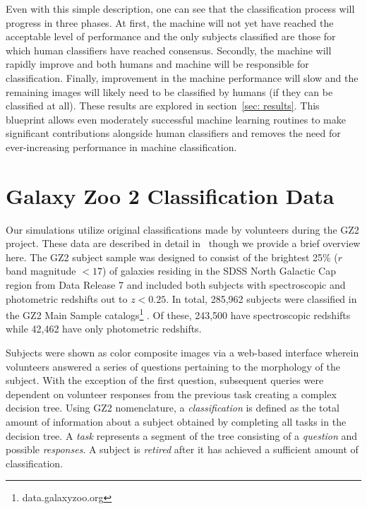 \documentclass[twocolumn]{aastex6}
\begin{document}
Even with this simple description, one can see that the classification process 
will progress in three phases. At first, the machine will not yet have reached the 
acceptable level of performance and the only subjects classified
 are those for which human classifiers have reached consensus. 
Secondly, the machine will rapidly improve and both humans and machine will be 
responsible for classification. Finally, improvement in the machine performance 
will slow and the remaining images will likely need to be classified by humans (if they can be 
classified at all). These results are explored in section~\ref{sec: results}. 
This blueprint allows even moderately successful machine learning 
routines to make significant contributions alongside human classifiers and 
removes the need for ever-increasing performance in machine classification.



\section{Galaxy Zoo 2 Classification Data} \label{sec: data}

Our simulations utilize original classifications made by volunteers during the GZ2 project. 
These data are described in detail in~\cite{Willett2013} though we provide a brief overview here.  
The GZ2 subject sample was designed to consist of the brightest 25\% ($r$ band magnitude $< 17$) 
of galaxies residing in the SDSS North Galactic Cap region from Data Release 7 
and included both subjects with spectroscopic and photometric redshifts out to $z < 0.25$.
In total, 285,962 subjects were classified in the GZ2 Main Sample 
catalogs\footnote{data.galaxyzoo.org} . 
Of these, 243,500 have spectroscopic redshifts while 42,462 have only photometric redshifts.  

Subjects were shown as color composite images via a web-based interface wherein 
volunteers answered a series of questions pertaining to the morphology of the subject.
With the exception of the first question, subsequent queries were 
dependent on volunteer responses from the previous task creating a complex decision tree. 
Using GZ2 nomenclature,  a \textit{classification} is defined as the total amount of
information about a subject obtained by completing all tasks in the decision tree. 
A \textit{task} represents a segment of the
tree consisting of a \textit{question} and possible \textit{responses}. 
A subject is \textit{retired} after it has achieved a sufficient amount of classification.
\end{document}
